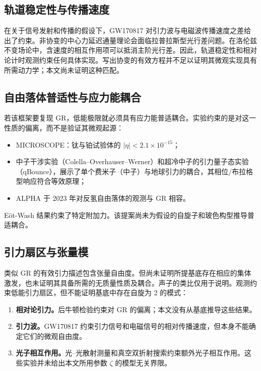 \documentclass[UTF8,fontset=none,11pt,a4paper]{ctexart}
\begin{document}
\subsection{轨道稳定性与传播速度}\label{sec:aberration}

在关于信号发射和传播的假设下，GW170817 对引力波与电磁波传播速度之差给出了约束\cite{GW170817}。非协变的中心力延迟通量理论会面临拉普拉斯型光行差问题。在洛伦兹不变场论中，含速度的相互作用项可以抵消主阶光行差\cite{Carlip2000}。因此，轨道稳定性和相对论计时观测约束任何具体实现\cite{Nordtvedt1977}。写出协变的有效方程并不足以证明其微观实现具有所需动力学；本文尚未证明这种匹配。

\subsection{自由落体普适性与应力能耦合}

若该框架要复现 GR，低能极限就必须具有应力能普适耦合。实验约束的是对这一性质的偏离，而不是验证其微观起源：
\begin{itemize}
\item MICROSCOPE：钛与铂试验体的 $|\eta|<2.1\times10^{-15}$\cite{Touboul2022}；
\item 中子干涉实验（Colella--Overhauser--Werner）\cite{Colella1975}和超冷中子的引力量子态实验（qBounce）\cite{Jenke2014}，展示了单个费米子（中子）与地球引力的耦合，其相位/布拉格型响应符合等效原理；
\item ALPHA 于 2023 年对反氢自由落体的观测与 GR 相容\cite{ALPHA2023}。
\end{itemize}
Eöt-Wash 结果约束了特定附加力\cite{Lee2020}。该提案尚未为假设的自旋子和玻色构型推导普适耦合。

\subsection{引力扇区与张量模}\label{sec:gravitonphoton}

类似 GR 的有效引力描述包含张量自由度。但尚未证明所提基底存在相应的集体激发，也未证明其具备所需的无质量性质及耦合。声子的类比仅用于说明。观测约束低能引力扇区，但不能证明基底中存在自旋为 2 的模式：
\begin{enumerate}
\item \textbf{相对论引力。}后牛顿检验约束对 GR 的偏离\cite{Will2018}；本文没有从基底推导这些结果。
\item \textbf{引力波。}GW170817 约束引力信号和电磁信号的相对传播速度，但本身不能确定它们的微观自由度。
\item \textbf{光子相互作用。}光--光散射测量和真空双折射搜索约束额外光子相互作用\cite{ATLAS2019,PVLAS2016,Mignani2017}。这些实验并未给出本文所用参数 $\zeta$ 的模型无关界限。
\end{enumerate}
\end{document}
